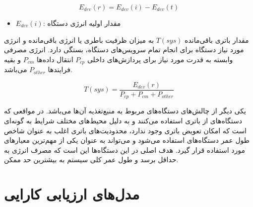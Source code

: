 \documentclass[a4paper]{article}
\begin{document}
\begin{equation}
    E_{dev}(r) = E_{dev}(i) - E_{dev}(t)
\end{equation}

\begin{itemize}
    \item $E_{dev}(i)$: مقدار اولیه انرژی دستگاه
\end{itemize}

مقدار باتری باقی‌مانده $T(sys)$ به میزان ظرفیت باطری یا انرژی باقی‌مانده و انرژی
مورد نیاز دستگاه برای انجام تمام سرویس‌های دستگاه، بستگی دارد. انرژی مصرفی
وابسته به قدرت مورد نیاز برای پردازش‌های داخلی $P_{cp}$ انتقال داده‌ها $P_{cm}$
و بقیه فرایند‌ها $P_{other}$ می‌باشد.

\begin{equation}
    T(sys) = \frac{E_{dev}(r)}{P_{cp} + P_{cm} + P_{other}}
\end{equation}

یکی دیگر از چالش‌های دستگاه‌های  مربوط به منبع‌تغذیه آن‌ها می‌باشد. در
مواقعی که دستگاه‌های  از باتری استفاده می‌کنند و به دلیل محیط‌های مختلف
شرایط به گونه‌ای است که امکان تعویض باتری وجود ندارد، محدودیت‌های باتری اغلب به
عنوان شاخص طول عمر دستگاه‌های  استفاده می‌شود و می‌تواند به عنوان یکی از
مهم‌ترین معیار‌های  مورد استفاده قرار گیرد. هدف اصلی در این دستگاه‌ها
این است که مصرف انرژی به حداقل برسد و طول عمر کلی سیستم به بیشترین حد ممکن.

\section{مدل‌های ارزیابی کارایی}

\newpage


\end{document}
